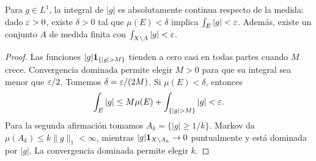 \begin{lema}\label{lema:v2-control-integral}
Para $g\in L^1$, la integral de $|g|$ es absolutamente continua respecto de la medida: dado $\varepsilon>0$, existe $\delta>0$ tal que $\mu(E)<\delta$ implica $\int_E|g|<\varepsilon$. Además, existe un conjunto $A$ de medida finita con $\int_{X\setminus A}|g|<\varepsilon$.
\end{lema}
\begin{proof}
Las funciones $|g|\ind{\{|g|>M\}}$ tienden a cero casi en todas partes cuando $M$ crece. Convergencia dominada permite elegir $M>0$ para que su integral sea menor que $\varepsilon/2$. Tomemos $\delta=\varepsilon/(2M)$. Si $\mu(E)<\delta$, entonces
\[\int_E|g|\le M\mu(E)+\int_{\{|g|>M\}}|g|<\eps.\]
Para la segunda afirmación tomamos $A_k=\{|g|\ge1/k\}$. Markov da $\mu(A_k)\le k\|g\|_1<\infty$, mientras $|g|\mathbf1_{X\setminus A_k}\to0$ puntualmente y está dominada por $|g|$. La convergencia dominada permite elegir $k$.
\end{proof}


